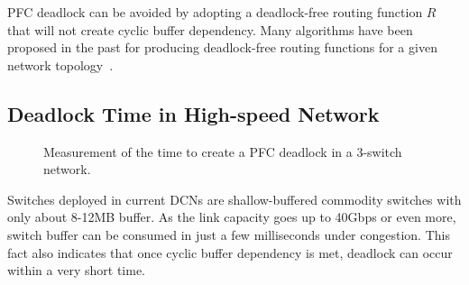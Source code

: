 PFC deadlock can be avoided by adopting a deadlock-free routing function $R$ that will not create cyclic buffer dependency. Many algorithms have been proposed in the past for producing deadlock-free routing functions for a given network topology~\cite{dally,flich2012survey,tcp-bolt}.

%

\subsection{Deadlock Time in High-speed Network}\label{subsec:deadlocktime}

\begin{figure}[t]
	\centering
	
	\vspace{-0.1in}
	\caption{Measurement of the time to create a PFC deadlock in a 3-switch network.}\label{fig:deadlocktime}
	\vspace{-0.2in}
\end{figure}

Switches deployed in current DCNs are shallow-buffered commodity switches with only about 8-12MB buffer. As the link capacity goes up to 40Gbps or even more,  switch buffer can be consumed in just a few milliseconds under congestion. This fact also indicates that once cyclic buffer dependency is met, deadlock can occur within a very short time.

